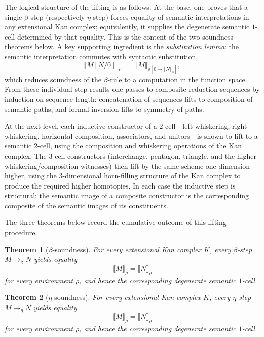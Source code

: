 \documentclass[webpdf,traditional,large,numbered]{oup-authoring-template}
\theoremstyle{thmstyleone}%
\newtheorem{theorem}{Theorem}[section]
\theoremstyle{thmstyletwo}%
\theoremstyle{thmstylethree}%
\begin{document}
The logical structure of the lifting is as follows.  At the base, one proves
that a single $\beta$-step (respectively $\eta$-step) forces equality of
semantic interpretations in any extensional Kan complex; equivalently, it
supplies the degenerate semantic $1$-cell determined by that equality.  This is
the content of the two soundness theorems below.  A key supporting ingredient is the
\emph{substitution lemma}: the semantic interpretation commutes with syntactic
substitution,
\[
  \llbracket M[N/0] \rrbracket_\rho
  \;=\;
  \llbracket M \rrbracket_{\rho[0\mapsto \llbracket N\rrbracket_\rho]},
\]
which reduces soundness of the $\beta$-rule to a computation in the function
space.  From these individual-step results one passes to composite reduction
sequences by induction on sequence length: concatenation of sequences lifts to
composition of semantic paths, and formal inversion lifts to symmetry of paths.

At the next level, each inductive constructor of a $2$-cell---left whiskering,
right whiskering, horizontal composition, associators, and unitors---is shown
to lift to a semantic $2$-cell, using the composition and whiskering operations
of the Kan complex.  The $3$-cell constructors (interchange, pentagon,
triangle, and the higher whiskering/composition witnesses) then lift by the
same scheme one dimension higher, using the $3$-dimensional horn-filling
structure of the Kan complex to produce the required higher homotopies.  In
each case the inductive step is structural: the semantic image of a composite
constructor is the corresponding composite of the semantic images of its
constituents.

The three theorems below record the cumulative outcome of this lifting
procedure.

\begin{theorem}[$\beta$-soundness]
  For every extensional Kan complex $K$, every $\beta$-step $M \to_\beta N$
  yields equality
  \[
    \llbracket M \rrbracket_\rho = \llbracket N \rrbracket_\rho
  \]
  for every environment $\rho$, and hence the corresponding degenerate semantic
  $1$-cell.
\end{theorem}

\begin{theorem}[$\eta$-soundness]
  For every extensional Kan complex $K$, every $\eta$-step $M \to_\eta N$
  yields equality
  \[
    \llbracket M \rrbracket_\rho = \llbracket N \rrbracket_\rho
  \]
  for every environment $\rho$, and hence the corresponding degenerate semantic
  $1$-cell.
\end{theorem}
\end{document}

